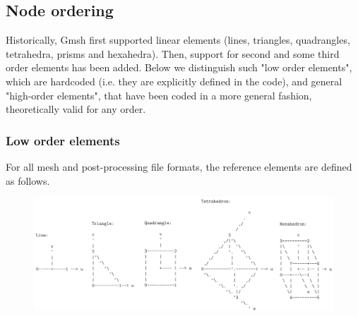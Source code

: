 \documentclass[dvipdfmx, 9pt, a4paper]{article}
\numberwithin{equation}{section}
\begin{document}
\subsection{Node ordering}
Historically, Gmsh first supported linear elements (lines, triangles, quadrangles, tetrahedra, prisms and hexahedra). Then, support for second and some third order elements has been added. Below we distinguish such "low order elements", which are hardcoded (i.e. they are
explicitly defined in the code), and general "high-order elements", that have been coded in a more general fashion, theoretically valid for any order.

\subsubsection{Low order elements}
For all mesh and post-processing file formats, the reference elements are defined as follows.

\begin{figure}[t]
\begin{center}
\includegraphics[width=18cm]{./pic/fig1.png}
\end{center}
\end{figure}
\end{document}

